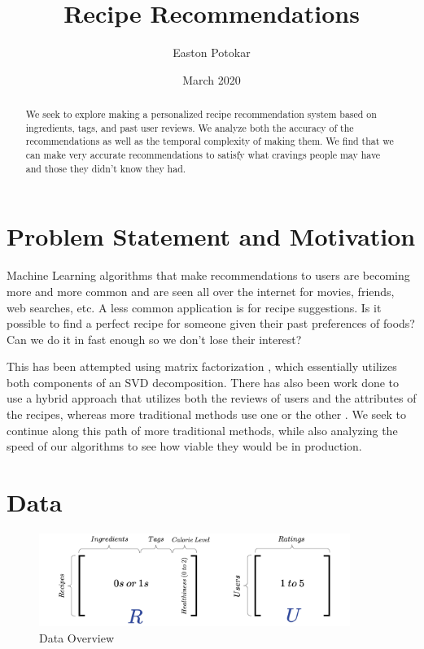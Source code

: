 \documentclass[11pt]{article}
\title{Recipe Recommendations}
\author{Easton Potokar}
\date{March 2020}
\begin{document}
\maketitle

\begin{abstract}
    We seek to explore making a personalized recipe recommendation system based on ingredients, tags, and past user reviews. We analyze both the accuracy of the recommendations as well as the temporal complexity of making them. We find that we can make very accurate recommendations to satisfy what cravings people may have and those they didn't know they had.
\end{abstract}

\section{Problem Statement and Motivation}
Machine Learning algorithms that make recommendations to users are becoming more and more common and are seen all over the internet for movies, friends, web searches, etc. A less common application is for recipe suggestions. Is it possible to find a perfect recipe for someone given their past preferences of foods? Can we do it in fast enough so we don't lose their interest?

This has been attempted using matrix factorization \cite{mf}, which essentially utilizes both components of an
SVD decomposition. There has also been work done to use a hybrid approach that utilizes both the reviews of users and the attributes of the recipes, whereas more traditional methods use one or the other \cite{india}.  We seek to continue along this path of more traditional methods, while also analyzing the speed of our algorithms to see how viable they would be in production.


\section{Data}
\begin{figure}[t]
\centering
\includegraphics[width=0.9\textwidth]{figs/data.pdf}
\caption{Data Overview}
\label{fig:data_overview}
\end{figure}
\end{document}
